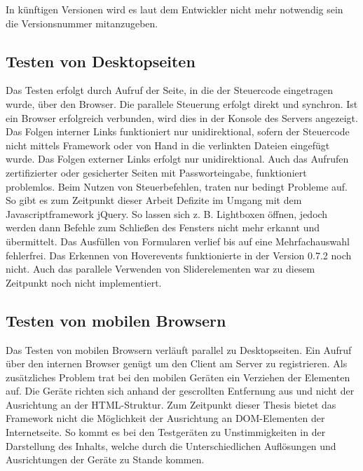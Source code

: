	In künftigen Versionen wird es laut dem Entwickler nicht mehr notwendig sein die Versionsnummer mitanzugeben.
	
	\subsection{Testen von Desktopseiten}
	Das Testen erfolgt durch Aufruf der Seite, in die der Steuercode eingetragen wurde, über den Browser. Die parallele Steuerung erfolgt direkt und synchron. Ist ein Browser erfolgreich verbunden, wird dies in der Konsole des Servers angezeigt.
	Das Folgen interner Links funktioniert nur unidirektional, sofern der Steuercode nicht mittels Framework oder von Hand in die verlinkten Dateien eingefügt wurde. Das Folgen externer Links erfolgt nur unidirektional. Auch das Aufrufen zertifizierter oder gesicherter Seiten mit Passworteingabe, funktioniert problemlos. Beim Nutzen von Steuerbefehlen, traten nur bedingt Probleme auf. So gibt es zum Zeitpunkt dieser Arbeit Defizite im Umgang mit dem Javascriptframework jQuery. So lassen sich z. B. Lightboxen öffnen, jedoch werden dann Befehle zum \mbox{Schließen} des Fensters nicht mehr erkannt und übermittelt. Das Ausfüllen von Formularen verlief bis auf eine Mehrfachauswahl fehlerfrei. Das Erkennen von Hoverevents funktionierte in der Version 0.7.2 noch nicht. Auch das parallele Verwenden von Sliderelementen war zu diesem Zeitpunkt noch nicht implementiert.
	
	\subsection{Testen von mobilen Browsern}
	Das Testen von mobilen Browsern verläuft parallel zu Desktopseiten. Ein Aufruf über den internen Browser genügt um den Client am Server zu registrieren. Als zusätzliches Problem trat bei den mobilen Geräten ein Verziehen der Elementen auf. Die Geräte richten sich anhand der gescrollten Entfernung aus und nicht der Ausrichtung an der HTML-Struktur. Zum Zeitpunkt dieser Thesis bietet das Framework nicht die Möglichkeit der Ausrichtung an DOM-Elementen der Internetseite. So kommt es bei den Testgeräten zu Unstimmigkeiten in der Darstellung des Inhalts, welche durch die Unterschiedlichen Auflösungen und Ausrichtungen der Geräte zu Stande kommen.
	
